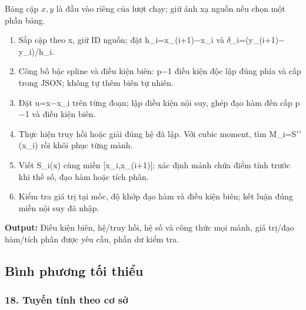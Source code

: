Bảng cặp $x,y$ là đầu vào riêng của lượt chạy; giữ ánh xạ nguồn nếu chọn một phần bảng.

\begin{enumerate}

\item Sắp cặp theo x,\allowbreak{} giữ ID nguồn;\allowbreak{} đặt h\_i=\allowbreak{}x\_(\allowbreak{}i+\allowbreak{}1)\ensuremath{-}x\_i và \ensuremath{\delta}\_i=\allowbreak{}(\allowbreak{}y\_(\allowbreak{}i+\allowbreak{}1)\ensuremath{-}y\_i)/\allowbreak{}h\_i.

\item Công bố bậc spline và điều kiện biên: p\ensuremath{-}1 điều kiện độc lập đúng phía và cấp trong JSON;\allowbreak{} không tự thêm biên tự nhiên.

\item Đặt u=\allowbreak{}x\ensuremath{-}x\_i trên từng đoạn;\allowbreak{} lập điều kiện nội suy,\allowbreak{} ghép đạo hàm đến cấp p\ensuremath{-}1 và điều kiện biên.

\item Thực hiện truy hồi hoặc giải đúng hệ đã lập. Với cubic moment,\allowbreak{} tìm M\_i=\allowbreak{}S\ensuremath{\prime\prime}(\allowbreak{}x\_i) rồi khôi phục từng mảnh.

\item Viết S\_i(\allowbreak{}x) cùng miền [x\_i,\allowbreak{}x\_(\allowbreak{}i+\allowbreak{}1)];\allowbreak{} xác định mảnh chứa điểm tính trước khi thế số,\allowbreak{} đạo hàm hoặc tích phân.

\item Kiểm tra giá trị tại mốc,\allowbreak{} độ khớp đạo hàm và điều kiện biên;\allowbreak{} kết luận đúng miền nội suy đã nhập.

\end{enumerate}

\textbf{Output:} Điều kiện biên,\allowbreak{} hệ/\allowbreak{}truy hồi,\allowbreak{} hệ số và công thức mọi mảnh,\allowbreak{} giá trị/\allowbreak{}đạo hàm/\allowbreak{}tích phân được yêu cầu,\allowbreak{} phần dư kiểm tra.

\subsection{Bình phương tối thiểu}

\examplebreak\subsubsection*{18. Tuyến tính theo cơ sở}

